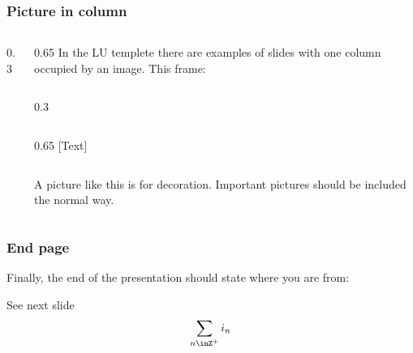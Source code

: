 \documentclass[aspectratio=1610]{beamer}
\begin{document}
\begin{frame}[fragile]
  \frametitle{Picture in column}
  \begin{columns}[onlytextwidth]
    \begin{column}[c]{0.3\linewidth}
    \end{column}%
    \begin{column}[c]{0.65\linewidth}
      In the LU templete there are examples of slides with one column occupied by an image. This frame:
\begin{CodeBox}{}
\begin{columns}[onlytextwidth]
  \begin{column}{0.3\textwidth}
  \end{column}
\end{columns}%
\begin{column}{0.65\textwidth}
  [Text]
\end{column}
\end{CodeBox}      
A picture like this is for decoration. Important pictures should be included the normal way.
\end{column}
\end{columns}
\end{frame}



\begin{frame}[fragile]
  \frametitle{End page}
  Finally, the end of the presentation should state where you are from:
\begin{CodeBox}{}
\begin{frame}[plain]
  \endpage
\end{frame}%
\end{CodeBox}
  See next slide
  \begin{displaymath}
    \sum_{n\inZ^+}i_n
  \end{displaymath}
\end{frame}

\begin{frame}[plain]
  \endpage
\end{frame}

\end{document}
